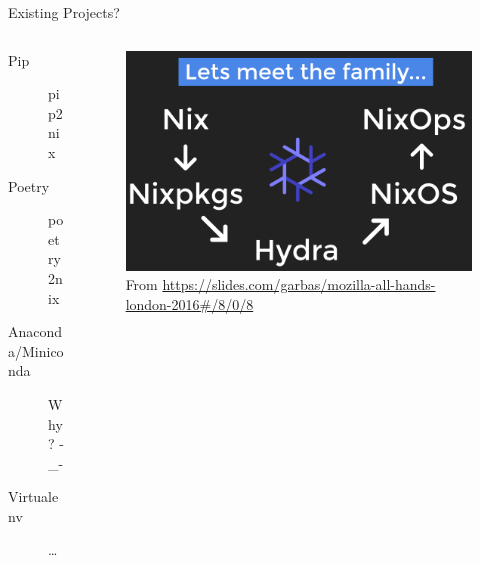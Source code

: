 \documentclass[bigger,unknownkeysallowed,aspectratio=169,colorblocks]{beamer}
\begin{document}
\begin{frame}[label={sec:orgad987dd}]{Existing Projects?}
\begin{columns}
\begin{column}{0.4\columnwidth}
\begin{description}
\item[{Pip}] pip2nix
\item[{Poetry}] poetry2nix
\item[{Anaconda/Miniconda}] Why? -\_-
\item[{Virtualenv}] \ldots{}
\end{description}
\end{column}
\begin{column}{0.6\columnwidth}
\begin{figure}[htbp]
\centering
\includegraphics[width=.9\linewidth]{images/A_screenshot/2020-05-22_23-55-07_screenshot.png}
\caption{From \url{https://slides.com/garbas/mozilla-all-hands-london-2016\#/8/0/8}}
\end{figure}
\end{column}
\end{columns}
\end{frame}
\end{document}
